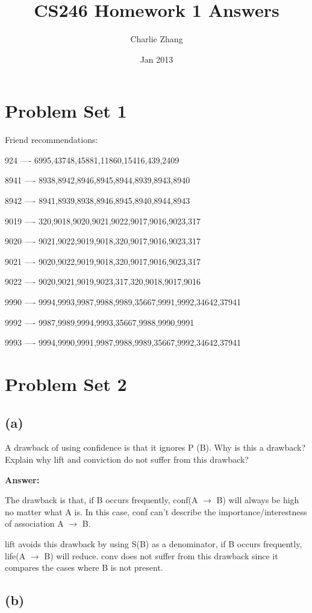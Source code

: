 \documentclass{article}
\title{CS246 Homework 1 Answers}
\author{Charlie Zhang}
\date{Jan 2013}
\begin{document}
\maketitle
\section{Problem Set 1}

Friend recommendations:

924 ---- 6995,43748,45881,11860,15416,439,2409

8941 ---- 8938,8942,8946,8945,8944,8939,8943,8940

8942 ---- 8941,8939,8938,8946,8945,8940,8944,8943

9019 ---- 320,9018,9020,9021,9022,9017,9016,9023,317

9020 ---- 9021,9022,9019,9018,320,9017,9016,9023,317

9021 ---- 9020,9022,9019,9018,320,9017,9016,9023,317

9022 ---- 9020,9021,9019,9023,317,320,9018,9017,9016

9990 ---- 9994,9993,9987,9988,9989,35667,9991,9992,34642,37941

9992 ---- 9987,9989,9994,9993,35667,9988,9990,9991

9993 ---- 9994,9990,9991,9987,9988,9989,35667,9992,34642,37941


\section{Problem Set 2}
\subsection{(a)}

A drawback of using confidence is that it ignores P (B). Why is this a drawback? Explain
why lift and conviction do not suffer from this drawback?

\textbf{Answer:}

The drawback is that, if B occurs frequently, conf(A $\rightarrow$ B) will always be high no matter what A is. In this case, conf can't describe the importance/interestness of association A $\rightarrow$ B.

lift avoids this drawback by using S(B) as a denominator, if B occurs frequently, life(A $\rightarrow$ B) will reduce.
conv does not suffer from this drawback since it compares the cases where B is not present.


\subsection{(b)}
\end{document}
